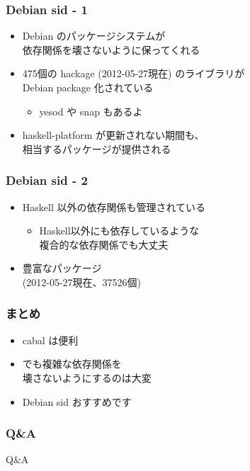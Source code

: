 \documentclass[cjk,dvipdfm,14pt]{beamer}
\begin{document}
\begin{frame}
\frametitle{Debian sid - 1}

\begin{itemize}
\item Debian のパッケージシステムが\\依存関係を壊さないように保ってくれる
\item 475個の hackage (2012-05-27現在) のライブラリが\\ Debian package 化されている
  \begin{itemize}
  \item yesod や snap もあるよ
  \end{itemize}
\item haskell-platform が更新されない期間も、\\相当するパッケージが提供される
\end{itemize}

\end{frame}

\begin{frame}
\frametitle{Debian sid - 2}

\begin{itemize}
\item Haskell 以外の依存関係も管理されている
  \begin{itemize}
  \item Haskell以外にも依存しているような\\複合的な依存関係でも大丈夫
  \end{itemize}
\item 豊富なパッケージ\\(2012-05-27現在、37526個)
\end{itemize}

\end{frame}

\begin{frame}
\frametitle{まとめ}

\begin{itemize}
\item cabal は便利
\item でも複雑な依存関係を\\壊さないようにするのは大変
\item Debian sid おすすめです
\end{itemize}

\end{frame}

\begin{frame}
\frametitle{Q\&A}

{\Huge Q\&A}

\end{frame}
\end{document}
